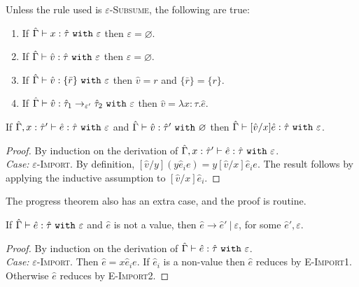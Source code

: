\begin{lemma}
Unless the rule used is \textsc{$\varepsilon$-Subsume}, the following are true:
\begin{enumerate}
	\setlength\itemsep{-0.7em}
	\item If $\hat \Gamma \vdash x: \hat \tau~\mathtt{with}~ \varepsilon$ then $\varepsilon = \varnothing$.
	\item If $\hat \Gamma \vdash \hat v: \hat \tau~\mathtt{with}~ \varepsilon$ then $\varepsilon = \varnothing$.
	\item If $\hat \Gamma \vdash \hat v: \{ \bar r \}~\mathtt{with}~ \varepsilon$ then $\hat v = r$ and $\{ \bar r \} = \{ r \}$.
	\item If $\hat \Gamma \vdash \hat v: \hat \tau_1 \rightarrow_{\varepsilon'} \hat \tau_2~\mathtt{with}~ \varepsilon$ then $\hat v = \lambda x:\tau. \hat e$.
\end{enumerate}
\end{lemma}

\begin{lemma}
If $\hat \Gamma, x: \hat \tau' \vdash \hat e: \hat \tau~\mathtt{with}~ \varepsilon$ and $\hat \Gamma \vdash \hat v: \hat \tau'~\mathtt{with}~ \varnothing$ then $\hat \Gamma \vdash [\hat v/x]\hat e: \hat \tau~\mathtt{with}~ \varepsilon$.
\end{lemma}

\begin{proof} By induction on the derivation of $\hat \Gamma, x: \hat \tau' \vdash \hat e: \hat \tau~\mathtt{with}~ \varepsilon$.\\

\textit{Case:} \textsc{$\varepsilon$-Import}. By definition, $[\hat v/y]({y}{\hat e_i}{e}) = {y}{[\hat v/x] \hat e_i}{e}$. The result follows by applying the inductive assumption to $[\hat v/x] \hat e_i$.
\end{proof}

The progress theorem also has an extra case, and the proof is routine.

\begin{theorem}
If $\hat \Gamma \vdash \hat e: \hat \tau~\mathtt{with}~ \varepsilon$ and $\hat e$ is not a value, then $\hat e \longrightarrow \hat e'~|~\varepsilon$, for some $\hat e', \varepsilon$.
\end{theorem}

\begin{proof} By induction on the derivation of $\hat \Gamma \vdash \hat e: \hat \tau~\mathtt{with}~ \varepsilon$.\\

\textit{Case:} \textsc{$\varepsilon$-Import}. Then $\hat e = {x}{\hat e_i}{e}$. If $\hat e_i$ is a non-value then $\hat e$ reduces by \textsc{E-Import1}. Otherwise $\hat e$ reduces by \textsc{E-Import2}.
\end{proof}

